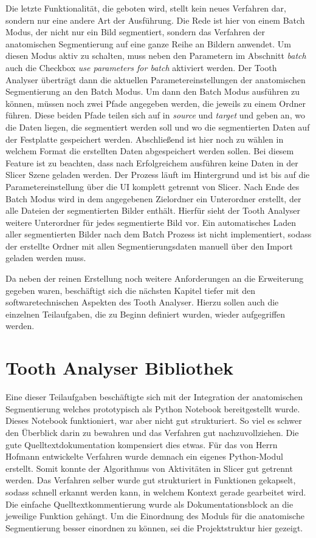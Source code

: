 Die letzte Funktionalität, die geboten wird, stellt kein neues Verfahren dar, sondern
nur eine andere Art der Ausführung. Die Rede ist hier von einem Batch Modus, der
nicht nur ein Bild segmentiert, sondern das Verfahren der anatomischen
Segmentierung auf eine ganze Reihe an Bildern anwendet. Um diesen Modus aktiv zu
schalten, muss neben den Parametern im Abschnitt \textit{batch} auch die Checkbox
\textit{use parameters for batch} aktiviert werden. Der Tooth Analyser überträgt
dann die aktuellen Parametereinstellungen der anatomischen Segmentierung an den Batch
Modus. Um dann den Batch Modus ausführen zu können, müssen noch zwei Pfade angegeben
werden, die jeweils zu einem Ordner führen. Diese beiden Pfade teilen sich auf in
\textit{source} und \textit{target} und geben an, wo die Daten liegen, die segmentiert
werden soll und wo die segmentierten Daten auf der Festplatte gespeichert werden.
Abschließend ist hier noch zu wählen in welchem Format die erstellten Daten
abgespeichert werden sollen. Bei diesem Feature ist zu beachten, dass nach
Erfolgreichem ausführen keine Daten in der Slicer Szene geladen werden. Der Prozess
läuft im Hintergrund und ist bis auf die Parametereinstellung über die UI komplett
getrennt von Slicer. Nach Ende des Batch Modus wird in dem angegebenen
Zielordner ein Unterordner erstellt, der alle Dateien der segmentierten Bilder enthält.
Hierfür sieht der Tooth Analyser weitere Unterordner für jedes segmentierte Bild
vor. Ein automatisches Laden aller segmentierten Bilder nach dem Batch Prozess ist
nicht implementiert, sodass der erstellte Ordner mit allen Segmentierungsdaten
manuell über den Import geladen werden muss.

Da neben der reinen Erstellung noch weitere Anforderungen an die Erweiterung
gegeben waren, beschäftigt sich die nächsten Kapitel tiefer mit den softwaretechnischen
Aspekten des Tooth Analyser. Hierzu sollen auch die einzelnen Teilaufgaben, die zu
Beginn definiert wurden, wieder aufgegriffen werden.

\section{Tooth Analyser Bibliothek}
Eine dieser Teilaufgaben beschäftigte sich mit der Integration der anatomischen
Segmentierung welches prototypisch als Python Notebook bereitgestellt wurde. Dieses
Notebook funktioniert, war aber nicht gut strukturiert. So viel es schwer den Überblick
darin zu bewahren und das Verfahren gut nachzuvollziehen. Die gute
Quelltextdokumentation kompensiert dies etwas. Für das von Herrn Hofmann entwickelte
Verfahren wurde demnach ein eigenes Python-Modul erstellt. Somit konnte der
Algorithmus von Aktivitäten in Slicer gut getrennt werden. Das Verfahren selber wurde
gut strukturiert in Funktionen gekapselt, sodass schnell erkannt werden kann, in
welchem Kontext gerade gearbeitet wird. Die einfache Quelltextkommentierung
wurde als Dokumentationsblock an die jeweilige Funktion gehängt. Um die Einordnung
des Moduls für die anatomische Segmentierung besser einordnen zu können, sei die
Projektstruktur hier gezeigt.


